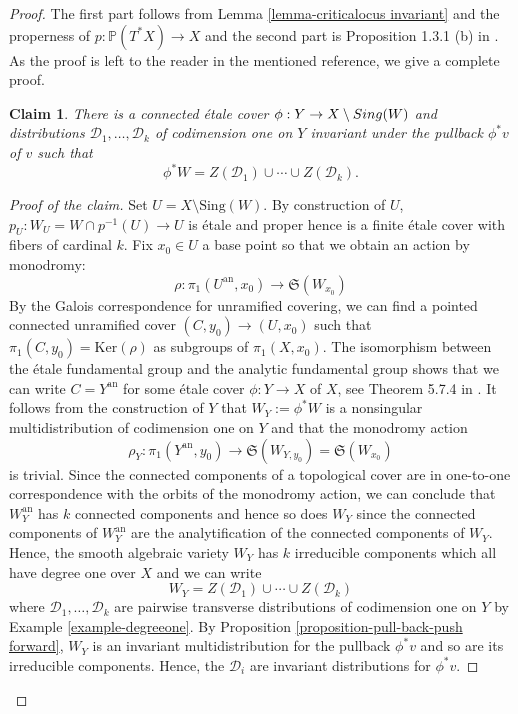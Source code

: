 \documentclass[12pt]{amsart}
\renewcommand{\P}{\mathbb{P}}
\theoremstyle{definition}
\theoremstyle{plain}
\newtheorem{claim}{Claim}
\theoremstyle{exampstyle}
\theoremstyle{exampstyle}\newtheorem{thmxbis}{Theorem}
\numberwithin{equation}{section}
\theoremstyle{remark}
\begin{document}
\begin{proof} 
The first part follows from Lemma \ref{lemma-criticalocus invariant} and the properness of $p : \P(T^\ast X) \rightarrow X$ and the second part is Proposition 1.3.1 (b) in \cite{Pereira-Pirio}. As the proof is left to the reader in the mentioned reference, we give a complete proof. 


\begin{claim}
There is a connected étale cover 
$\phi :Y \rightarrow X \setminus \mathcal \mathrm{Sing}(W)$ 
and  distributions $\mathcal D_1,\ldots, \mathcal D_k$ of codimension one on $Y$ invariant under the pullback $\phi^\ast v$ of $v$ such that 
$$ \phi^\ast W = Z(\mathcal D_1) \cup  \cdots \cup Z(\mathcal D_k).$$
\end{claim}

\begin{proof}[Proof of the claim]
Set $U = X \setminus \mathrm{Sing}(W)$. By construction of $U$, $p_U: W_U = W \cap p^{-1}(U) \rightarrow U$
is étale and proper hence is a finite étale cover with fibers of cardinal $k$. Fix $x_0 \in U$ a base point so that we obtain an action by monodromy: 
$$\rho: \pi_1(U^{\mathrm{an}},x_0) \rightarrow \mathfrak S(W_{x_0})$$
By the Galois correspondence for unramified covering, we can find 
a pointed connected unramified cover $(C,y_0) \rightarrow (U,x_0)$ such that $\pi_1(C,y_0) = \mathrm{Ker}(\rho)$ as subgroups of $\pi_1(X,x_0)$.
The isomorphism between the étale fundamental group and the analytic fundamental group shows that we can write $C = Y^{\mathrm{an}}$ for some étale cover $\phi: Y \rightarrow X$ of $X$, see Theorem 5.7.4 in \cite{Szamuely}.  It follows from the construction of $Y$ that $W_Y := \phi^\ast W$ is a nonsingular multidistribution of codimension one on $Y$ and that the monodromy action  
$$ \rho_Y: \pi_1(Y^{\mathrm{an}},y_0) \rightarrow \mathfrak S(W_{Y,y_0}) =  \mathfrak S (W_{x_0})$$ 
is trivial. Since the connected components of a topological cover are in one-to-one correspondence with the orbits of the monodromy action, we can conclude that  $W_Y^{\mathrm{an}}$ has $k$ connected components and hence so does $W_Y$ since the connected components of $W^{\mathrm{an}}_Y$ are the analytification of the connected components of $W_Y$. Hence, the smooth algebraic variety $W_Y$ has $k$ irreducible components which all have degree one over $X$ and we can write
$$ W_Y = Z(\mathcal D_1) \cup \cdots \cup Z(\mathcal D_k)$$ where $\mathcal D_1,\ldots, \mathcal D_k$ are pairwise transverse distributions of codimension one on $Y$ by Example \ref{example-degreeone}. By Proposition \ref{proposition-pull-back-push forward}, $W_Y$ is an invariant multidistribution for the pullback $\phi^\ast v$ and so are its irreducible components. Hence, the $\mathcal D_i$ are invariant distributions for $\phi^\ast v$. 
\end{proof} 



\end{proof}
\end{document}
